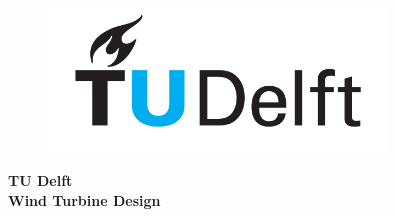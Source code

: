 


    \begin{figure}[H]
    \centering
    \includegraphics[width=9cm]{Images/TU-Delft_logo.png}
    \end{figure}


	\begin{center}
{
    \textbf
    {TU Delft\\
     Wind Turbine Design}
    }
        
\author{Edoardo Bologna [4417526]
\and
Antariksh Dicholkar [4469844]
\and
Linn Fröström [4544285]
\and 
Davide Passoni [4542207]
\and
Lukas Moy [4541030]
}
 
    
	\end{center}
    
    \vspace{10 mm}

	\begingroup
    	\let\newpage\relax
    	\maketitle
	\endgroup
	
    \vspace{10 mm}
    
    \newpage




    
 

\thispagestyle{empty}

\newpage

\tableofcontents

\newpage

\newpage











%

%

%

%

%







\nocite{*}

%


